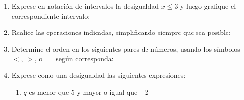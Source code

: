 \documentclass[fleqn]{article}
\begin{document}
\begin{enumerate}
  \item Exprese en notación de intervalos la desigualdad \;$ x\leq 3 $\; y luego grafique el correspondiente intervalo:
  \item Realice las operaciones indicadas, simplificando siempre que sea posible:
  \begin{enumerate}
  \end{enumerate}
  \item Determine el orden en los siguientes pares de números, usando los símbolos $<$, $>$, o $=$ según corresponda:
  \begin{enumerate}
  \end{enumerate}
  \item Exprese como una desigualdad las siguientes expresiones:
  \begin{enumerate}
    \item $ q $ es menor que 5 y mayor o igual que $ -2 $ 

\end{enumerate}
\end{enumerate}
\end{document}
